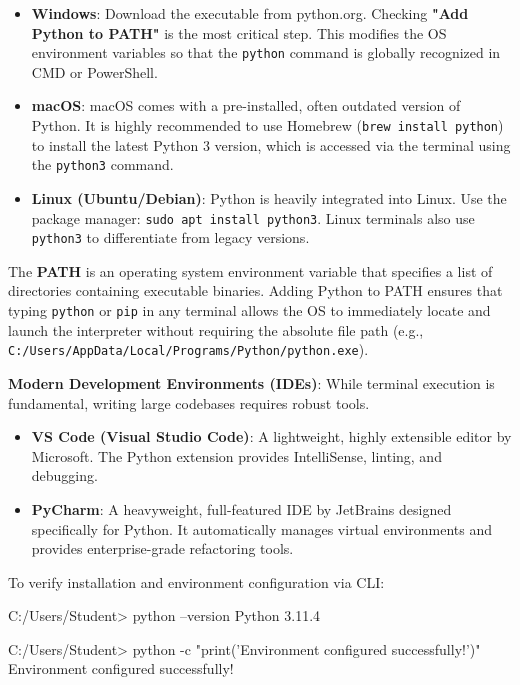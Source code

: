 \begin{itemize}[leftmargin=1.5em]
    \item \textbf{Windows}: Download the executable from python.org. Checking \textbf{"Add Python to PATH"} is the most critical step. This modifies the OS environment variables so that the \texttt{python} command is globally recognized in CMD or PowerShell.
    \item \textbf{macOS}: macOS comes with a pre-installed, often outdated version of Python. It is highly recommended to use Homebrew (\texttt{brew install python}) to install the latest Python 3 version, which is accessed via the terminal using the \texttt{python3} command.
    \item \textbf{Linux (Ubuntu/Debian)}: Python is heavily integrated into Linux. Use the package manager: \texttt{sudo apt install python3}. Linux terminals also use \texttt{python3} to differentiate from legacy versions.
\end{itemize}

\begin{conceptbox}
The \textbf{PATH} is an operating system environment variable that specifies a list of directories containing executable binaries. Adding Python to PATH ensures that typing \texttt{python} or \texttt{pip} in any terminal allows the OS to immediately locate and launch the interpreter without requiring the absolute file path (e.g., \texttt{C:/Users/AppData/Local/Programs/Python/python.exe}).
\end{conceptbox}

\textbf{Modern Development Environments (IDEs)}:
While terminal execution is fundamental, writing large codebases requires robust tools. 
\begin{itemize}[leftmargin=1.5em]
    \item \textbf{VS Code (Visual Studio Code)}: A lightweight, highly extensible editor by Microsoft. The Python extension provides IntelliSense, linting, and debugging.
    \item \textbf{PyCharm}: A heavyweight, full-featured IDE by JetBrains designed specifically for Python. It automatically manages virtual environments and provides enterprise-grade refactoring tools.
\end{itemize}

To verify installation and environment configuration via CLI:
\begin{outputbox}
C:/Users/Student> python --version
Python 3.11.4

C:/Users/Student> python -c "print('Environment configured successfully!')"
Environment configured successfully!
\end{outputbox}

